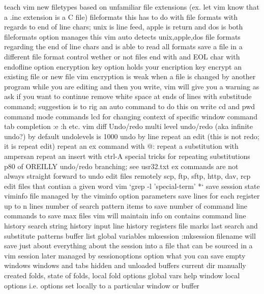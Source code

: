 \documentclass[12pt]{book}
\begin{document}
{{    teach vim new filetypes based on unfamiliar file extensions (ex. let vim know that a .inc extension is a C file)
    fileformats
      this has to do with file formats with regards to end of line chars; unix is line feed, apple is return and dos is both
      fileformats option manages this
      vim auto detects unix,apple,dos file formats regarding the end of line chars and is able to read all formats
      save a file in a different file format
    control wether or not files end with and EOL char with endofline option
    encryption
      key option holds your encription key
      encrypt an existing file or new file
      vim encryption is weak
    when a file is changed by another program while you are editing and then you write, vim will give you a warning as ask if you want to continue
    remove white space at ends of lines with substitude command; suggestion is to rig an auto command to do this on write
    cd and pwd command mode commands
      lcd for changing context of specific window
  command tab completion :e :h etc.
  vim diff
  Undo/redo
    multi level undo/redo (aka infinite undo?)
      by default undolevels is 1000
    undo by line
    repeat an edit (this is not redo; it is repeat edit)
    repeat an ex command with @:
    repeat a substitution with ampersan
    repeat an insert with ctrl-A
    special tricks for repeating substitutions p80 of OREILLY
    undo/redo branching; see usr32.txt
    ex commands are not always straight forward to undo
  edit files remotely
    scp, ftp, sftp, http, dav, rcp
  edit files that contian a given word
    vim `grep -l 'special-term' *`
  save session state
    viminfo file
      managed by the viminfo option parameters
        save lines for each register up to n lines
        number of search pattern items to save
        number of command line commands to save
        max files vim will maintain info on
      contains
        command line history
        search string history
        input line history
        registers
        file marks
        last search and substitute patterns
        buffer list
        global variables
    mksession
      :mksession filename will save just about everything about the session into a file that can be sourced in a vim session later
      managed by sessionoptions option
      what you can save
        empty windows
        windows and tabs
        hidden and unloaded buffers
        current dir
        manually created folds, state of folds, local fold options
        global vars
        help window
        local options i.e. options set locally to a particular window or buffer
}}
\end{document}
